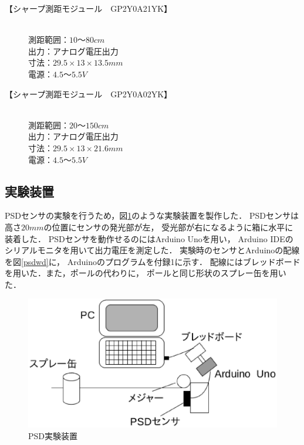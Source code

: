 \documentclass[11pt,a4]{jsarticle}
\begin{document}
 \begin{description}
  \item[【シャープ測距モジュール　GP2Y0A21YK】] \mbox{} \\
	     測距範囲：$10〜80\unit{cm}$ \\
	     出力：アナログ電圧出力 \\
	     寸法：$29.5×13×13.5\unit{mm}$ \\
	     電源：$4.5〜5.5\unit{V}$
  \item[【シャープ測距モジュール　GP2Y0A02YK】] \mbox{} \\
	     測距範囲：$20〜150\unit{cm}$ \\
	     出力：アナログ電圧出力 \\
	     寸法：$29.5×13×21.6\unit{mm}$ \\
	     電源：$4.5〜5.5\unit{V}$
 \end{description}


\subsection{実験装置}
PSDセンサの実験を行うため，図\ref{psded}のような実験装置を製作した．
PSDセンサは高さ$20\unit{mm}$の位置にセンサの発光部が左，
受光部が右になるように箱に水平に装着した．
PSDセンサを動作せるのにはArduino Unoを用い，
Arduino IDEのシリアルモニタを用いて出力電圧を測定した．
実験時のセンサとArduinoの配線を図\ref{psdwd}に，
Arduinoのプログラムを付録1に示す．
配線にはブレッドボードを用いた．また，ポールの代わりに，
ポールと同じ形状のスプレー缶を用いた．

\begin{figure}[t]
  \begin{center}
   \includegraphics[scale = 0.8]{picture/psded.eps}
   \caption{PSD実験装置}
   \label{psded}
  \end{center}
\end{figure}
\end{document}
